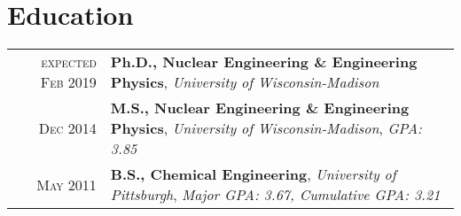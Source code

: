 
\vspace{0mm}
\section{Education}
\normalsize
\vspace{-1mm} \begin{tabular}{r|p{15cm}}


	\textsc{expected Feb 2019} &
        \textbf{Ph.D., Nuclear Engineering \& Engineering Physics}, \emph{University of Wisconsin-Madison} \\
	\textsc{Dec 2014}  & 
	\textbf{M.S., Nuclear Engineering \& Engineering Physics}, \emph{University of Wisconsin-Madison}, \textit{GPA: 3.85} \\
	\textsc{May 2011} &
	\textbf{B.S., Chemical Engineering}, \emph{University of Pittsburgh}, \textit{Major GPA: 3.67, Cumulative GPA: 3.21 }
\end{tabular}
